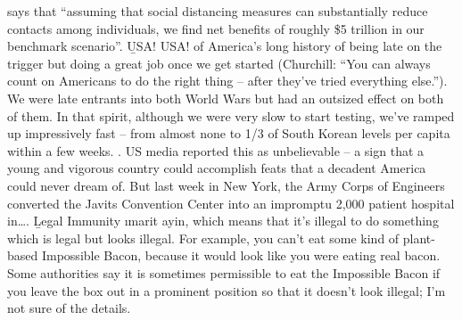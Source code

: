 \begin{xmlentries}
\begin{xmlentriescontent}
{ says that “assuming that social distancing measures can substantially reduce contacts among individuals, we find net benefits of roughly \$5 trillion in our benchmark scenario”.
\p\b{USA! USA!}
\p{} of America’s long history of being late on the trigger but doing a great job once we get started (Churchill: “You can always count on Americans to do the right thing – after they’ve tried everything else.”). We were late entrants into both World Wars but had an outsized effect on both of them. In that spirit, although we were very slow to start testing, we’ve ramped up impressively fast – from almost none to 1/3 of South Korean levels per capita within a few weeks. 
. US media reported this as unbelievable – a sign that a young and vigorous country could accomplish feats that a decadent America could never dream of. But last week in New York, the Army Corps of Engineers converted the Javits Convention Center into an impromptu 2,000 patient hospital in…. 
\p\b{Legal Immunity}
\i{marit ayin}, which means that it’s illegal to do something which is legal but looks illegal. For example, you can’t eat some kind of plant-based Impossible Bacon, because it would look like you were eating real bacon. Some authorities say it is sometimes permissible to eat the Impossible Bacon if you leave the box out in a prominent position so that it doesn’t look illegal; I’m not sure of the details.
}
\end{xmlentriescontent}
\end{xmlentries}
